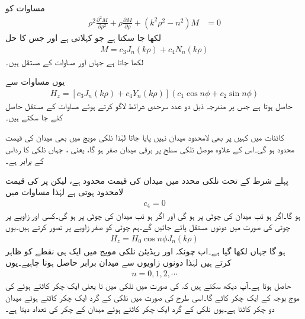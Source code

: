 مساوات  کو
\begin{align}
\rho^2 \frac{\partial^2 M}{\partial \rho^2} +\rho \frac{\partial M}{\partial \rho} +(k^2 \rho^2-n^2)M &=0
\end{align}
لکھا جا سکتا ہے جو  کہلاتی ہے اور جس کا حل
\begin{align}
M=c_3 J_n(k \rho)+c_4 N_n(k\rho)
\end{align}
لکھا جاتا ہے جہاں  اور  مساوات کے مستقل ہیں۔

یوں مساوات  سے
\begin{align}\label{مساوات_مویج_نلکی_حل_الف}
H_z=\left[c_3 J_n(k \rho)+c_4 Y_n(k\rho)\right]\left(c_1 \cos n \phi +c_2 \sin n \phi\right)
\end{align}
حاصل ہوتا ہے جس پر مندرجہ ذیل دو عدد سرحدی شرائط لاگو کرتے ہوئے مساوات کے مستقل حاصل کئے جا سکتے ہیں۔

کائنات میں کہیں پر بھی لامحدود میدان نہیں پایا جاتا لہٰذا نلکی مویج میں بھی میدان کی قیمت محدود ہو گی۔اس کے علاوہ موصل نلکی سطح پر برقی میدان صفر
 ہو گا، یعنی ، جہاں نلکی کا رداس  کے برابر ہے۔

 پہلے شرط کے تحت نلکی محدد میں میدان کی قیمت محدود ہے، لیکن  پر  کی قیمت لامحدود ہوتی ہے لہٰذا مساوات  میں 
\begin{align}
c_4=0
\end{align}   
ہو گا۔اگر  ہو تب میدان کی چوٹی  پر ہو گی  اور اگر  ہو تب میدان کی چوٹی  پر ہو گی۔کسی اور زاویے پر چوٹی کی صورت میں دونوں مستقل پائے جائیں گے۔ہم چوٹی کو صفر زاویے پر تصور کرتے ہیں۔یوں
\begin{align}\label{مساوات_مویج_نلکی_حل_ب}
H_z=H_0  \cos n \phi  J_n(k \rho)
\end{align}
ہو گا جہاں  لکھا گیا ہے۔اب چونکہ  اور  ریڈیئن نلکی مویج میں ایک ہی نقطے کو ظاہر کرتے ہیں لہٰذا دونوں زاویوں سے میدان برابر حاصل ہونا چاہیے۔یوں
\begin{align*}
n=0,1,2,\cdots
\end{align*}
حاصل ہوتا ہے۔آپ دیکھ سکتے ہیں کہ  کی صورت میں نلکی میں  تا  یعنی ایک چکر کاٹتے ہوئے   کی موج بوجہ  کے ایک چکر کاٹے گا۔اسی طرح  کی صورت میں نلکی کے گرد ایک چکر کاٹتے ہوئے میدان دو چکر کاٹتا ہے۔یوں نلکی کے گرد ایک چکر کاٹتے ہوئے میدان کے چکر کی تعداد  دیتا ہے۔

